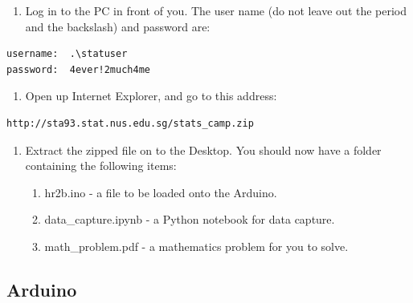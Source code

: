 \documentclass[11pt]{article}
\providecommand{\tightlist}{%
  \setlength{\itemsep}{0pt}\setlength{\parskip}{0pt}}
\begin{document}
\begin{enumerate}
\def\labelenumi{\arabic{enumi}.}
\tightlist
\item
  Log in to the PC in front of you. The user name (do not leave out the
  period and the backslash) and password are:
\end{enumerate}

\begin{verbatim}
username:  .\statuser
password:  4ever!2much4me
\end{verbatim}

\begin{enumerate}
\def\labelenumi{\arabic{enumi}.}
\setcounter{enumi}{1}
\tightlist
\item
  Open up Internet Explorer, and go to this address:
\end{enumerate}

\begin{verbatim}
http://sta93.stat.nus.edu.sg/stats_camp.zip
\end{verbatim}

\begin{enumerate}
\def\labelenumi{\arabic{enumi}.}
\setcounter{enumi}{2}
\tightlist
\item
  Extract the zipped file on to the Desktop. You should now have a
  folder containing the following items:

  \begin{enumerate}
  \def\labelenumii{\arabic{enumii}.}
  \tightlist
  \item
    hr2b.ino - a file to be loaded onto the Arduino.
  \item
    data\_capture.ipynb - a Python notebook for data capture.
  \item
    math\_problem.pdf - a mathematics problem for you to solve.
  \end{enumerate}
\end{enumerate}

\hypertarget{arduino}{%
\subsection{Arduino}\label{arduino}}
\end{document}
